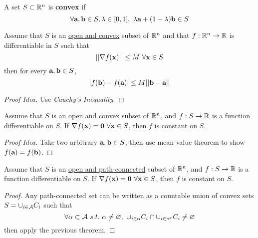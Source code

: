 \documentclass[11pt]{article}
\begin{document}
			\begin{definition}
				A set $S \subset \mathbb{R}^n$ is \textbf{convex} if
				\begin{equation}
					\forall \textbf{a}, \textbf{b} \in S, \lambda \in [0, 1],\ \lambda \textbf{a} + (1 - \lambda) \textbf{b} \in S
				\end{equation}				
			\end{definition}
			
			\begin{theorem}
				Assume that $S$ is an \ul{open and convex} subset of $\mathbb{R}^n$ and that $f: \mathbb{R}^n \to \mathbb{R}$ is differentiable in $S$ such that
				\begin{equation}
					\norm{\nabla f(\vex)} \leq M\ \forall \vex \in S
				\end{equation}
				then for every $\textbf{a}, \textbf{b} \in S$,
				\begin{equation}
					|f(\textbf{b}) - f(\textbf{a})| \leq M \vert \vert {\textbf{b}- \textbf{a}} \vert \vert
				\end{equation}
				\begin{proof}[Proof Idea]
					Use \emph{Cauchy's Inequality}.
				\end{proof}
			\end{theorem}
			
			\begin{theorem}
				Assume that $S$ is an \ul{open and convex} subset of $\mathbb{R}^n$, and $f: S \to \mathbb{R}$ is a function differentiable on $S$. If $\nabla f(\textbf{x}) = \textbf{0}\ \forall \textbf{x} \in S$, then $f$ is constant on $S$.
				\begin{proof}[Proof Idea]
					Take two arbitrary $\textbf{a}, \textbf{b} \in S$, then use mean value theorem to show $f(\textbf{a}) = f(\textbf{b})$.
				\end{proof}
			\end{theorem}
			
			\begin{theorem}
				Assume that $S$ is an \ul{open and path-connected} subset of $\mathbb{R}^n$, and $f: S \to \mathbb{R}$ is a function differentiable on $S$. If $\nabla f(\textbf{x}) = \textbf{0}\ \forall \textbf{x} \in S$, then $f$ is constant on $S$.
				\begin{proof}
					Any path-connected set can be written as a countable union of convex sets $S = \cup_{i \in \mathcal{{A}}} C_i$ such that
					\begin{equation}
						\forall \alpha \subset \mathcal{{A}}\ s.t.\ \alpha \neq \varnothing,\ \cup_{i \in \alpha} C_i \cap \cup_{i \in \alpha^c} C_i \neq \varnothing
					\end{equation}
					then apply the previous theorem.
				\end{proof}
			\end{theorem}
			
\end{document}
